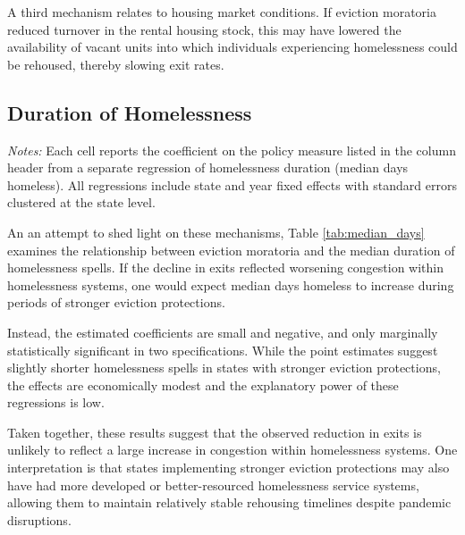 \documentclass[12pt]{article}
\begin{document}
A third mechanism relates to housing market conditions. If eviction moratoria reduced turnover in the rental housing stock, this may have lowered the availability of vacant units into which individuals experiencing homelessness could be rehoused, thereby slowing exit rates.

\subsection{Duration of Homelessness}

\begin{table}[H]
\centering
\begin{threeparttable}
\caption{Eviction Moratoria and Homelessness Duration}
\label{tab:median_days}

\begin{tablenotes}[flushleft]
\footnotesize
\item \textit{Notes:} Each cell reports the coefficient on the policy measure listed in the column header from a separate regression of homelessness duration (median days homeless). All regressions include state and year fixed effects with standard errors clustered at the state level.
\end{tablenotes}
\end{threeparttable}
\end{table}

An an attempt to shed light on these mechanisms, Table \ref{tab:median_days} examines the relationship between eviction moratoria and the median duration of homelessness spells. If the decline in exits reflected worsening congestion within homelessness systems, one would expect median days homeless to increase during periods of stronger eviction protections. 

Instead, the estimated coefficients are small and negative, and only marginally statistically significant in two specifications. While the point estimates suggest slightly shorter homelessness spells in states with stronger eviction protections, the effects are economically modest and the explanatory power of these regressions is low. 

Taken together, these results suggest that the observed reduction in exits is unlikely to reflect a large increase in congestion within homelessness systems. One interpretation is that states implementing stronger eviction protections may also have had more developed or better-resourced homelessness service systems, allowing them to maintain relatively stable rehousing timelines despite pandemic disruptions.
\end{document}
